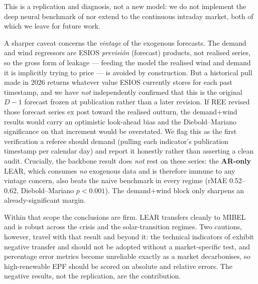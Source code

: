 \documentclass[11pt,a4paper]{article}
\begin{document}
This is a replication and diagnosis, not a new model: we do not implement the deep
neural benchmark of \citet{lago2021} nor extend to the continuous intraday market,
both of which we leave for future work.

A sharper caveat concerns the \emph{vintage} of the exogenous forecasts. The demand
and wind regressors are ESIOS \textit{previsi\'on} (forecast) products, not realised
series, so the gross form of leakage --- feeding the model the realised wind and
demand it is implicitly trying to price --- is avoided by construction. But a
historical pull made in 2026 returns whatever value ESIOS currently stores for each
past timestamp, and we have \emph{not} independently confirmed that this is the
original $D\!-\!1$ forecast frozen at publication rather than a later revision. If
REE revised those forecast series ex post toward the realised outturn, the
demand$+$wind results would carry an optimistic look-ahead bias and the
Diebold--Mariano significance on that increment would be overstated. We flag this as
the first verification a referee should demand (pulling each indicator's publication
timestamp per calendar day) and report it honestly rather than asserting a clean
audit. Crucially, the backbone result does \emph{not} rest on these series: the
\textbf{AR-only} LEAR, which consumes \emph{no} exogenous data and is therefore
immune to any vintage concern, also beats the naive benchmark in every regime (rMAE
0.52--0.62, Diebold--Mariano $p<0.001$). The demand$+$wind block only sharpens an
already-significant margin.

Within that scope the conclusions are firm. LEAR transfers cleanly to
MIBEL and is robust across the crisis and the solar-transition regimes. Two
cautions, however, travel with that result and beyond it: the technical indicators
of \citet{demir2020} exhibit negative transfer and should not be adopted without a
market-specific test, and percentage error metrics become unreliable exactly as a
market decarbonises, so high-renewable EPF should be scored on absolute and
relative errors. The negative results, not the replication, are the contribution.


\end{document}
